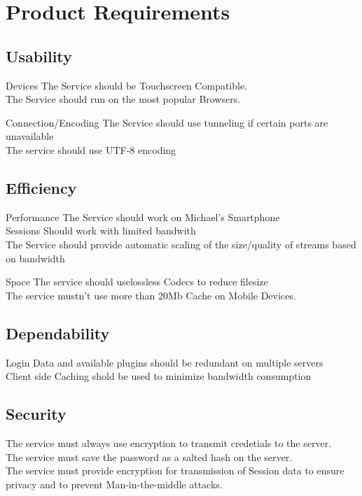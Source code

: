 \documentclass[8pt]{beamer}
\begin{document}
\section{Product Requirements}
\subsection{Usability}
\begin{frame}{Devices}
The Service should be Touchscreen Compatible.\\\pause
The Service should run on the most popular Browsers.
\end{frame}

\begin{frame}{Connection/Encoding}
The Service should use tunneling if certain ports are unavailable\\\pause
The service should use UTF-8 encoding
\end{frame}
\subsection{Efficiency}
\begin{frame}{Performance}
The Service should work on Michael's Smartphone\\\pause
Sessions Should work with limited bandwith\\\pause
The Service should provide automatic scaling of the size/quality of streams based on bandwidth
\end{frame}
\begin{frame}{Space}
The service should uselossless Codecs to reduce filesize\\\pause
The service mustn't use more than 20Mb Cache on Mobile Devices.
\end{frame}
\subsection{Dependability}
\begin{frame}
Login Data and available plugins should be redundant on multiple servers\\\pause
Client side Caching shold be used to minimize bandwidth consumption
\end{frame}
\subsection{Security}
\begin{frame}
The service must always use encryption to transmit credetials to
the server.\\\pause
The service must save the password as a salted hash on the server.\\\pause
The service must provide encryption for transmission of Session
data to ensure privacy and to prevent Man-in-the-middle attacks.
\end{frame}
\end{document}

